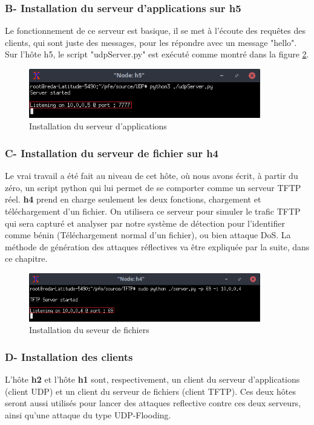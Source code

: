 \subsubsection{B- Installation du serveur d'applications sur h5}
Le fonctionnement de ce serveur est basique, il se met à l'écoute des requêtes des clients, qui sont juste des messages, pour les répondre avec un message "hello". Sur l'hôte h5, le script "udpServer.py" est exécuté comme montré dans la figure \ref{fig:udpServer}.
\begin{figure}[h]
\centering
\includegraphics[width=0.9\textwidth]{Figures/simulation/mininet/UDP/server/start}
\decoRule
\caption{Installation du serveur d'applications}
\label{fig:udpServer}
\end{figure}

\subsubsection{C- Installation du serveur de fichier sur h4}
Le vrai travail a été fait au niveau de cet hôte, où nous avons écrit, à partir du zéro, un script python qui lui permet de se comporter comme un serveur TFTP réel. \textbf{h4} prend en charge seulement les deux fonctions, chargement et téléchargement d'un fichier. On utilisera ce serveur pour simuler le trafic TFTP qui sera capturé et analyser par notre système de détection pour l'identifier comme bénin (Téléchargement normal d'un fichier), ou bien attaque DoS. La méthode de génération des attaques réflectives va être expliquée par la suite, dans ce chapitre.
\begin{figure}[h]
\centering
\includegraphics[width=0.9\textwidth]{Figures/simulation/mininet/TFTP/server/start}
\decoRule
\caption{Installation du seveur de fichiers}
\label{fig:udpServer}
\end{figure}

\subsubsection{D- Installation des clients}
L'hôte \textbf{h2} et l'hôte \textbf{h1} sont, respectivement, un client du serveur d'applications (client UDP) et un client du serveur de fichiers (client TFTP). Ces deux hôtes seront aussi utilisés pour lancer des attaques reflective contre ces deux serveurs, ainsi qu'une attaque du type UDP-Flooding.\\

